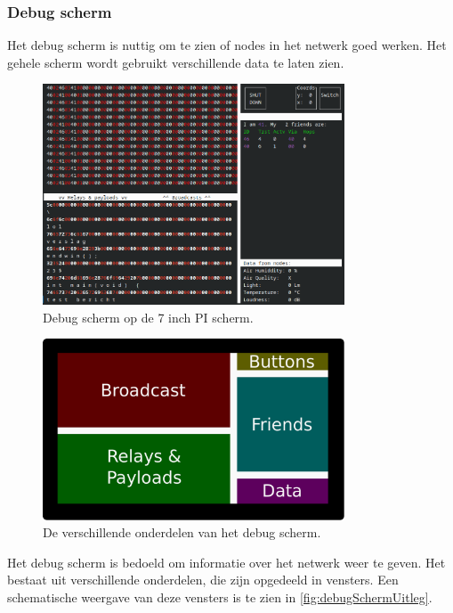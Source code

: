 \subsubsection*{Debug scherm}
Het debug scherm is nuttig om te zien of nodes in het netwerk goed werken. 
Het gehele scherm wordt gebruikt verschillende data te laten zien. 
\begin{figure}[ht]
    \centering
    \includegraphics*[width=0.8\textwidth]{img/basestationInterface.png}
    \caption{Debug scherm op de 7 inch PI scherm.}
    \label{fig:debugSchermScreenshot}
\end{figure}

\begin{figure}[ht]
    \centering
    \includegraphics*[width=0.8\textwidth]{img/debugScreenExplain.pdf}
    \caption{De verschillende onderdelen van het debug scherm.}
    \label{fig:debugSchermUitleg}
\end{figure}
Het debug scherm is bedoeld om informatie over het netwerk weer te geven. Het bestaat uit verschillende onderdelen, die zijn opgedeeld in vensters. Een schematische weergave van deze vensters is te zien in \autoref{fig:debugSchermUitleg}.

